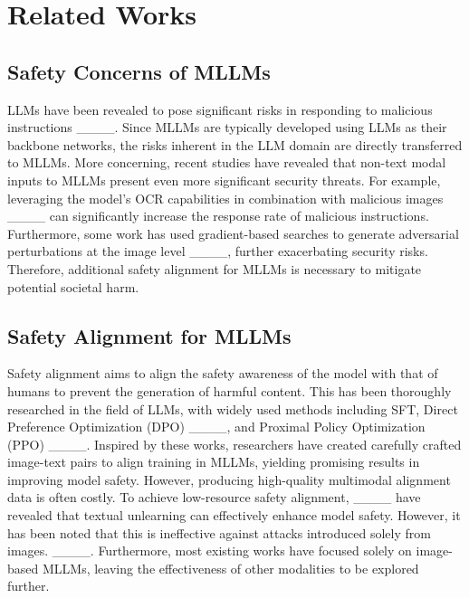 \section{Related Works}
\subsection{Safety Concerns of MLLMs}
LLMs have been revealed to pose significant risks in responding to malicious instructions ____. 
Since MLLMs are typically developed using LLMs as their backbone networks, the risks inherent in the LLM domain are directly transferred to MLLMs. 
More concerning, recent studies have revealed that non-text modal inputs to MLLMs present even more significant security threats. 
For example, leveraging the model's OCR capabilities in combination with malicious images ____ can significantly increase the response rate of malicious instructions. 
Furthermore, some work has used gradient-based searches to generate adversarial perturbations at the image level ____, further exacerbating security risks.
Therefore, additional safety alignment for MLLMs is necessary to mitigate potential societal harm.

\subsection{Safety Alignment for MLLMs}
Safety alignment aims to align the safety awareness of the model with that of humans to prevent the generation of harmful content. 
This has been thoroughly researched in the field of LLMs, with widely used methods including SFT, Direct Preference Optimization (DPO) ____, and Proximal Policy Optimization (PPO) ____. 
Inspired by these works, researchers have created carefully crafted image-text pairs to align training in MLLMs, yielding promising results in improving model safety. 
However, producing high-quality multimodal alignment data is often costly.
To achieve low-resource safety alignment, ____ have revealed that textual unlearning can effectively enhance model safety. 
However, it has been noted that this is ineffective against attacks introduced solely from images. ____. 
Furthermore, most existing works have focused solely on image-based MLLMs, leaving the effectiveness of other modalities to be explored further. 

